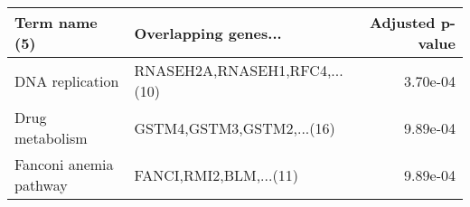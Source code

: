 \begin{tabular}{llr}
\toprule
         Term name (5) &          Overlapping genes... &  Adjusted p-value \\
\midrule
       DNA replication & RNASEH2A,RNASEH1,RFC4,...(10) &          3.70e-04 \\
       Drug metabolism &     GSTM4,GSTM3,GSTM2,...(16) &          9.89e-04 \\
Fanconi anemia pathway &        FANCI,RMI2,BLM,...(11) &          9.89e-04 \\
\bottomrule
\end{tabular}
